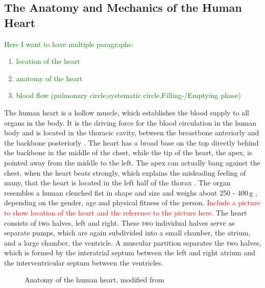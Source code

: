 \subsection{The Anatomy and Mechanics of the Human Heart}
\label{anatomy}
\textcolor{green}{
	Here I want to have multiple paragraphs:
	\begin{enumerate}
  		\item location of the heart  
  		\item anatomy of the heart
  		\item blood flow (pulmonary circle,systematic circle,Filling-/Emptying phase)
	\end{enumerate}
}
The human heart is a hollow muscle, which establishes the blood supply to all organs in the body. It is the driving force for the blood circulation in the human body and is located in the thoracic cavity, between the breastbone anteriorly and the backbone posteriorly \cite{sherwood07}. The heart has a broad base on the top directly behind the backbone in the middle of the chest, while the tip of the heart, the apex, is pointed away from the middle to the left. The apex can actually bang against the chest, when the heart beats strongly, which explains the misleading feeling of many, that the heart is located in the left half of the thorax \cite{sherwood07}. The organ resembles a human clenched fist in shape and size and weighs about 250 - 400\,g \cite{schwegler11}, depending on the gender, age and physical fitness of the person. \textcolor{red}{Include a picture to show location of the heart and the reference to the picture here.} 
\newline
The heart consists of two halves, left and right. These two individual halves serve as separate pumps, which are again subdivided into a small chamber, the atrium, and a large chamber, the ventricle. A muscular partition separates the two halves, which is formed by the interatrial septum between the left and right atrium and the interventricular septum between the ventricles.

\begin{figure}
\centering
{} 
\caption{Anatomy of the human heart, modified from}
\end{figure}




